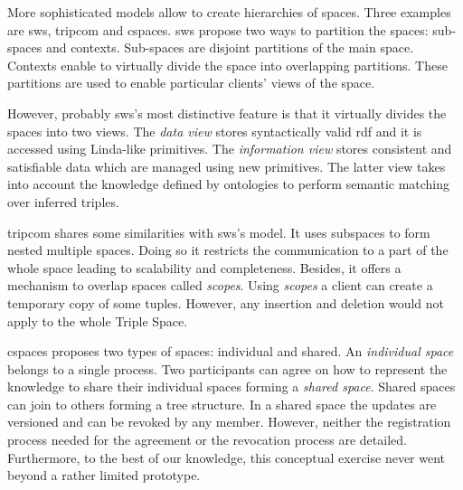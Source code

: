 More sophisticated models allow to create hierarchies of spaces.
Three examples are \ac{sws}, \ac{tripcom} \citep{simperl_coordination_2007} and \ac{cspaces}.
\ac{sws} \citep{tolksdorf_coordination_2006} propose two ways to partition the spaces: sub-spaces and contexts.
Sub-spaces are disjoint partitions of the main space.
Contexts enable to virtually divide the space into overlapping partitions.
These partitions are used to enable particular clients' views of the space.


However, probably \ac{sws}'s most distinctive feature is that it virtually divides the spaces into two views.
The \emph{data view} stores syntactically valid \ac{rdf} and it is accessed using Linda-like primitives.
The \emph{information view} stores consistent and satisfiable data which are managed using new primitives.
The latter view takes into account the knowledge defined by ontologies to perform semantic matching over inferred triples.


\ac{tripcom} shares some similarities with \ac{sws}'s model.
It uses subspaces to form nested multiple spaces.
Doing so it restricts the communication to a part of the whole space leading to scalability and completeness. %
Besides, it offers a mechanism to overlap spaces called \emph{scopes}.
Using \emph{scopes} a client can create a temporary copy of some tuples.
However, any insertion and deletion would not apply to the whole Triple Space.

\ac{cspaces} \citep{martinrecuerda_towards_2005} proposes two types of spaces: individual and shared.
An \emph{individual space} belongs to a single process.
Two participants can agree on how to represent the knowledge to share their individual spaces forming a \emph{shared space}.
Shared spaces can join to others forming a tree structure.
In a shared space the updates are versioned and can be revoked by any member.
However, neither the registration process needed for the agreement or the revocation process are detailed.
Furthermore, to the best of our knowledge, this conceptual exercise never went beyond a rather limited prototype.


